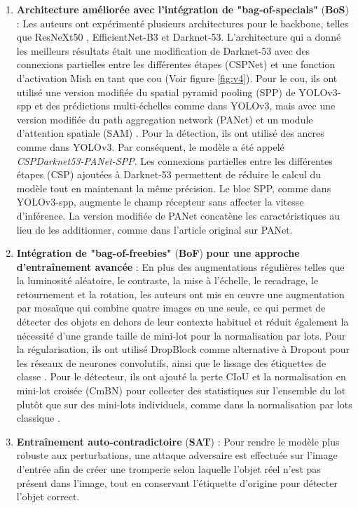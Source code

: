 \documentclass{article}
\begin{document}
\begin{enumerate}
    \item \textbf{Architecture améliorée avec l'intégration de "bag-of-specials"} (\textbf{BoS}) : Les auteurs ont expérimenté plusieurs architectures pour le backbone, telles que ResNeXt50 \cite{59}, EfficientNet-B3 \cite{60} et Darknet-53. L'architecture qui a donné les meilleurs résultats était une modification de Darknet-53 avec des connexions partielles entre les différentes étapes (CSPNet) \cite{61} et une fonction d'activation Mish \cite{57} en tant que cou (Voir figure \ref{fig:v4}). Pour le cou, ils ont utilisé une version modifiée du spatial pyramid pooling (SPP) \cite{48} de YOLOv3-spp et des prédictions multi-échelles comme dans YOLOv3, mais avec une version modifiée du path aggregation network (PANet) \cite{62} et un module d'attention spatiale (SAM) \cite{63}. Pour la détection, ils ont utilisé des ancres comme dans YOLOv3. Par conséquent, le modèle a été appelé \textit{CSPDarknet53-PANet-SPP}. Les connexions partielles entre les différentes étapes (CSP) ajoutées à Darknet-53 permettent de réduire le calcul du modèle tout en maintenant la même précision. Le bloc SPP, comme dans YOLOv3-spp, augmente le champ récepteur sans affecter la vitesse d'inférence. La version modifiée de PANet concatène les caractéristiques au lieu de les additionner, comme dans l'article original sur PANet.
    \item \textbf{Intégration de "bag-of-freebies"} (\textbf{BoF}) \textbf{pour une approche d'entraînement avancée} : En plus des augmentations régulières telles que la luminosité aléatoire, le contraste, la mise à l'échelle, le recadrage, le retournement et la rotation, les auteurs ont mis en œuvre une augmentation par mosaïque qui combine quatre images en une seule, ce qui permet de détecter des objets en dehors de leur contexte habituel et réduit également la nécessité d'une grande taille de mini-lot pour la normalisation par lots. Pour la régularisation, ils ont utilisé DropBlock \cite{64} comme alternative à Dropout \cite{65} pour les réseaux de neurones convolutifs, ainsi que le lissage des étiquettes de classe \cite{66,67}. Pour le détecteur, ils ont ajouté la perte CIoU \cite{68} et la normalisation en mini-lot croisée (CmBN) pour collecter des statistiques sur l'ensemble du lot plutôt que sur des mini-lots individuels, comme dans la normalisation par lots classique \cite{69}.
    \item \textbf{Entraînement auto-contradictoire} (\textbf{SAT}) : Pour rendre le modèle plus robuste aux perturbations, une attaque adversaire est effectuée sur l'image d'entrée afin de créer une tromperie selon laquelle l'objet réel n'est pas présent dans l'image, tout en conservant l'étiquette d'origine pour détecter l'objet correct.

\end{enumerate}
\end{document}
